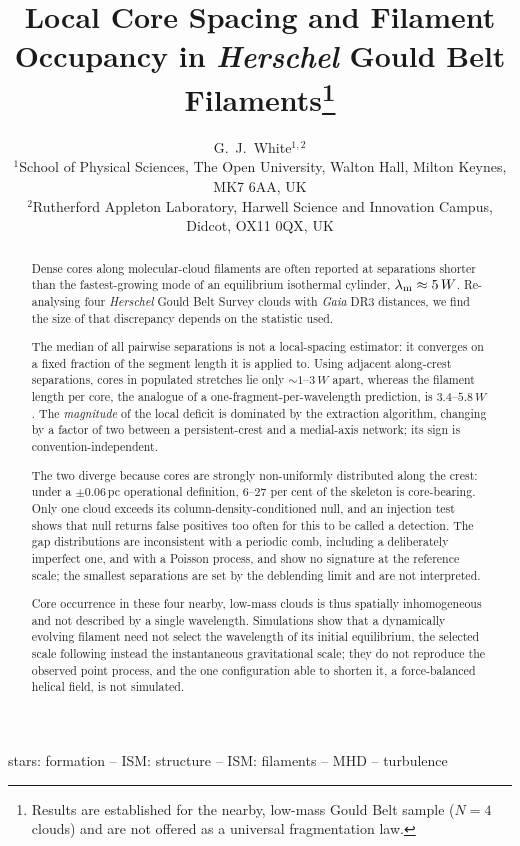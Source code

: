 \documentclass[usenatbib,twoside,twocolumn]{mnras}
\title[Core spacing and filament occupancy in HGBS filaments]{Local Core Spacing and Filament Occupancy in \textit{Herschel} Gould Belt Filaments\thanks{Results are established for the nearby, low-mass Gould Belt sample ($N=4$ clouds) and are not offered as a universal fragmentation law.}}
\author[G.~J.~White]{G.~J.~White$^{1,2}$\\
$^{1}$School of Physical Sciences, The Open University, Walton Hall, Milton Keynes, MK7 6AA, UK\\
$^{2}$Rutherford Appleton Laboratory, Harwell Science and Innovation Campus, Didcot, OX11 0QX, UK}
\begin{document}
\maketitle

\begin{abstract}
Dense cores along molecular-cloud filaments are often reported at separations shorter than the fastest-growing mode of an equilibrium isothermal cylinder, $\lambda_{\rm m}\approx5\,W$. Re-analysing four \textit{Herschel} Gould Belt Survey clouds with \textit{Gaia} DR3 distances, we find the size of that discrepancy depends on the statistic used.

The median of all pairwise separations is not a local-spacing estimator: it converges on a fixed fraction of the segment length it is applied to. Using adjacent along-crest separations, cores in populated stretches lie only $\sim1$--$3\,W$ apart, whereas the filament length per core, the analogue of a one-fragment-per-wavelength prediction, is $3.4$--$5.8\,W$. The \emph{magnitude} of the local deficit is dominated by the extraction algorithm, changing by a factor of two between a persistent-crest and a medial-axis network; its sign is convention-independent.

The two diverge because cores are strongly non-uniformly distributed along the crest: under a $\pm0.06$\,pc operational definition, $6$--$27$ per cent of the skeleton is core-bearing. Only one cloud exceeds its column-density-conditioned null, and an injection test shows that null returns false positives too often for this to be called a detection. The gap distributions are inconsistent with a periodic comb, including a deliberately imperfect one, and with a Poisson process, and show no signature at the reference scale; the smallest separations are set by the deblending limit and are not interpreted.

Core occurrence in these four nearby, low-mass clouds is thus spatially inhomogeneous and not described by a single wavelength. Simulations show that a dynamically evolving filament need not select the wavelength of its initial equilibrium, the selected scale following instead the instantaneous gravitational scale; they do not reproduce the observed point process, and the one configuration able to shorten it, a force-balanced helical field, is not simulated.
\end{abstract}

\begin{keywords}
stars: formation -- ISM: structure -- ISM: filaments -- MHD -- turbulence
\end{keywords}
\end{document}
